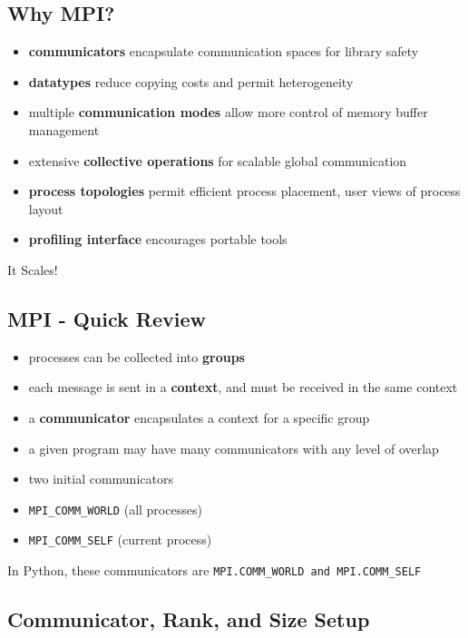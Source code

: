 \documentclass{article}
\begin{document}
    \subsection{Why MPI?}\label{why-mpi}

\begin{itemize}
\itemsep1pt\parskip0pt
\item
  \textbf{communicators} encapsulate communication spaces for library
  safety
\item
  \textbf{datatypes} reduce copying costs and permit heterogeneity
\item
  multiple \textbf{communication modes} allow more control of memory
  buffer management
\item
  extensive \textbf{collective operations} for scalable global
  communication
\item
  \textbf{process topologies} permit efficient process placement, user
  views of process layout
\item
  \textbf{profiling interface} encourages portable tools
\end{itemize}

It Scales!

    \subsection{MPI - Quick Review}\label{mpi---quick-review}

\begin{itemize}
\item
  processes can be collected into \textbf{groups}
\item
  each message is sent in a \textbf{context}, and must be received in
  the same context
\item
  a \textbf{communicator} encapsulates a context for a specific group
\item
  a given program may have many communicators with any level of overlap
\item
  two initial communicators
\item
  \texttt{MPI\_COMM\_WORLD} (all processes)
\item
  \texttt{MPI\_COMM\_SELF} (current process)
\end{itemize}

In Python, these communicators are
\texttt{MPI.COMM\_WORLD and MPI.COMM\_SELF}

    \subsection{Communicator, Rank, and Size
Setup}\label{communicator-rank-and-size-setup}
\end{document}
